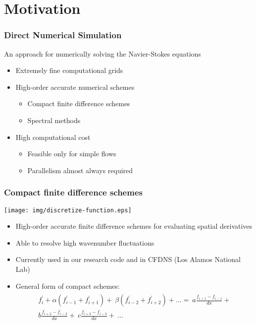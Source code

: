 
\section{Motivation}

\begin{frame}
\frametitle{Direct Numerical Simulation}

An approach for numerically solving
the Navier-Stokes equations

\begin{itemize}
\item Extremely fine computational grids
\item High-order accurate numerical schemes
    \begin{itemize}
    \item Compact finite difference schemes
    \item Spectral methods
    \end{itemize}
\item High computational cost
    \begin{itemize}
    \item Feasible only for simple flows
    \item Parallelism almost always required
    \end{itemize}
\end{itemize}
\end{frame}

\begin{frame}
\frametitle{Compact finite difference schemes}
\centering
\texttt{[image: img/discretize-function.eps]}
\begin{itemize}
\item High-order accurate finite difference schemes
for evaluating spatial derivatives
\item Able to resolve high wavenumber fluctuations
\item Currently used in our research code
    and in CFDNS (Los Alamos National Lab)
\item {General form of compact schemes:
\begin{align*}
\begin{split}
f_i^{\prime} + \alpha(f^{\prime}_{i-1} + f^{\prime}_{i+1}) + \
\beta(f^{\prime}_{i-2} + f^{\prime}_{i+2}) + \hdots  = \
a\frac{f_{i+1} - f_{i-1}}{dx} + \\
b\frac{f_{i+2} - f_{i-2}}{dx} + \
c\frac{f_{i+3} - f_{i-3}}{dx} + \
    \hdots
\end{split}
\end{align*}}
\end{itemize}
\end{frame}


